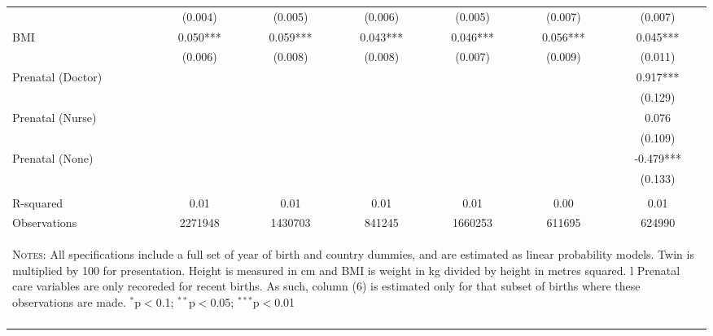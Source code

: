 \begin{landscape}
\begin{table}[htpb!]
\begin{center}
\begin{tabular}{lcccccc}
&(0.004)&(0.005)&(0.006)&(0.005)&(0.007)&(0.007)\\
BMI&0.050***&0.059***&0.043***&0.046***&0.056***&0.045***\\
&(0.006)&(0.008)&(0.008)&(0.007)&(0.009)&(0.011)\\
Prenatal (Doctor)&&&&&&0.917***\\
&&&&&&(0.129)\\
Prenatal (Nurse)&&&&&&0.076\\
&&&&&&(0.109)\\
Prenatal (None)&&&&&&-0.479***\\
&&&&&&(0.133)\\
&&&&&&\\R-squared&0.01&0.01&0.01&0.01&0.00&0.01\\
Observations &2271948&1430703&841245&1660253&611695&624990\\
\hline\hline\multicolumn{7}{p{14.3cm}}{\begin{footnotesize}\textsc{Notes:} All specifications include a full set of year of birth and  country dummies, and are estimated as linear probability models.  Twin is multiplied by 100 for presentation.  Height is measured in cm  and BMI is weight in kg divided by height in metres squared. l  Prenatal care variables are only recoreded for recent births.  As  such, column (6) is estimated only for that subset of births where  these observations are made.
$^{*}$p$<$0.1; $^{**}$p$<$0.05; $^{***}$p$<$0.01
 \end{footnotesize}}\\ \hline \normalsize \end{tabular}\end{center}\end{table}\end{landscape} 
